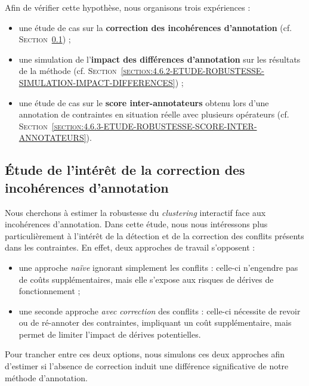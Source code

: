 	Afin de vérifier cette hypothèse, nous organisons trois expériences :
	\begin{itemize}
		\item une étude de cas sur la \textbf{correction des incohérences d'annotation} (cf. \textsc{Section~\ref{section:4.6.1-ETUDE-ROBUSTESSE-INTERETS-CORRECTION-INCOHERENCES}}) ;
		\item une simulation de l'\textbf{impact des différences d'annotation} sur les résultats de la méthode (cf. \textsc{Section~\ref{section:4.6.2-ETUDE-ROBUSTESSE-SIMULATION-IMPACT-DIFFERENCES}}) ;
		\item une étude de cas sur le \textbf{score inter-annotateurs} obtenu lors d'une annotation de contraintes en situation réelle avec plusieurs opérateurs (cf. \textsc{Section~\ref{section:4.6.3-ETUDE-ROBUSTESSE-SCORE-INTER-ANNOTATEURS}}).
	\end{itemize}
	
	
	\subsection{Étude de l'intérêt de la correction des incohérences d'annotation}
	\label{section:4.6.1-ETUDE-ROBUSTESSE-INTERETS-CORRECTION-INCOHERENCES}
		
		Nous cherchons à estimer la robustesse du \textit{clustering} interactif face aux incohérences d'annotation.
		Dans cette étude, nous nous intéressons plus particulièrement à l'intérêt de la détection et de la correction des conflits présents dans les contraintes.
		En effet, deux approches de travail s'opposent :
		\begin{itemize}
			\item une approche \textit{naïve} ignorant simplement les conflits : celle-ci n'engendre pas de coûts supplémentaires, mais elle s'expose aux risques de dérives de fonctionnement ;
			\item une seconde approche \textit{avec correction} des conflits : celle-ci nécessite de revoir ou de ré-annoter des contraintes, impliquant un coût supplémentaire, mais permet de limiter l'impact de dérives potentielles.
		\end{itemize}
		Pour trancher entre ces deux options, nous simulons ces deux approches afin d'estimer si l'absence de correction induit une différence significative de notre méthode d'annotation.
	
